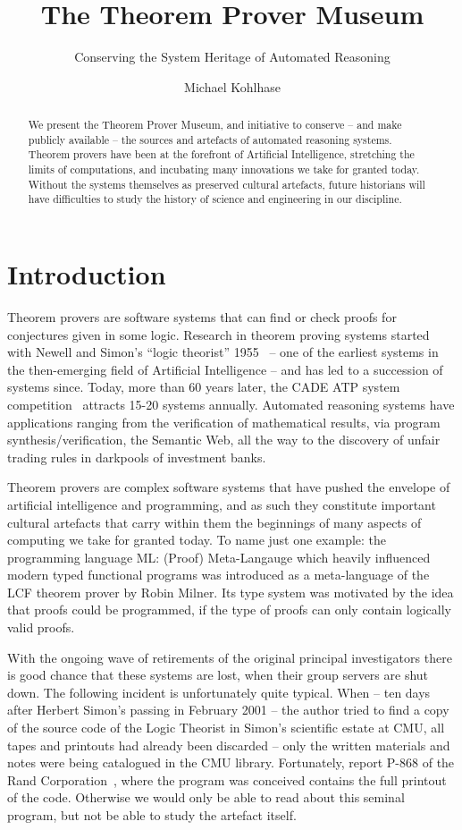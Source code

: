 \documentclass[smallcondensed]{svjour3}
\title{The Theorem Prover Museum}
\subtitle{Conserving the System Heritage of Automated Reasoning}
\author{Michael Kohlhase}
\institute{Computer Science, FAU Erlangen-N\"urnberg\\\url{http://kwarc.info/kohlhase}}
\begin{document}
\maketitle
\begin{abstract}
  We present the Theorem Prover Museum, and initiative to conserve -- and make publicly
  available -- the sources and artefacts of automated reasoning systems.  Theorem provers
  have been at the forefront of Artificial Intelligence, stretching the limits of
  computations, and incubating many innovations we take for granted today. Without the
  systems themselves as preserved cultural artefacts, future historians will have
  difficulties to study the history of science and engineering in our discipline. 
\end{abstract}
\section{Introduction}\label{sec:intro}

Theorem provers are software systems that can find or check proofs for conjectures given
in some logic. Research in theorem proving systems started with Newell and Simon's ``logic
theorist'' 1955~\cite{NewSim:ltmcips56} -- one of the earliest systems in the
then-emerging field of Artificial Intelligence -- and has led to a succession of systems
since. Today, more than 60 years later, the CADE ATP system competition~\cite{CASC}
attracts 15-20 systems annually. Automated reasoning systems have applications ranging
from the verification of mathematical results, via program synthesis/verification, the
Semantic Web, all the way to the discovery of unfair trading rules in darkpools of
investment banks.

Theorem provers are complex software systems that have pushed the envelope of artificial
intelligence and programming, and as such they constitute important cultural artefacts
that carry within them the beginnings of many aspects of computing we take for granted
today. To name just one example: the programming language ML: (Proof) Meta-Langauge which
heavily influenced modern typed functional programs was introduced as a meta-language of
the LCF theorem prover by Robin Milner. Its type system was motivated by the idea that
proofs could be programmed, if the type of proofs can only contain logically valid
proofs.

With the ongoing wave of retirements of the original principal investigators there is good
chance that these systems are lost, when their group servers are shut down. The following
incident is unfortunately quite typical. When -- ten days after Herbert Simon's passing in
February 2001 -- the author tried to find a copy of the source code of the Logic Theorist
in Simon's scientific estate at CMU, all tapes and printouts had already been discarded --
only the written materials and notes were being catalogued in the CMU
library. Fortunately, report P-868 of the Rand Corporation~\cite{NewSim:ltmcips56}, where
the program was conceived contains the full printout of the code. Otherwise we would only
be able to read about this seminal program, but not be able to study the artefact
itself. 
\end{document}
